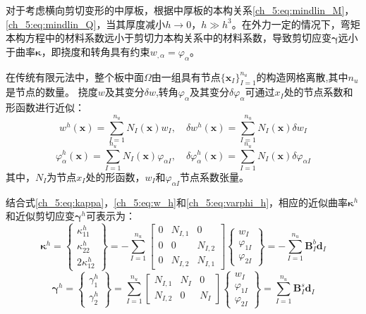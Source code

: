 对于考虑横向剪切变形的中厚板，根据中厚板的本构关系\eqref{ch_5:eq:mindlin_M}，\eqref{ch_5:eq:mindlin_Q}，当其厚度减小$h\rightarrow 0$，$h \gg h^3$。在外力一定的情况下，弯矩本构方程中的材料系数远小于剪切力本构关系中的材料系数，导致剪切应变$\boldsymbol \gamma$远小于曲率$\boldsymbol \kappa$，即挠度和转角具有约束$w_{,\alpha} = \varphi_\alpha$。

在传统有限元法中，整个板中面$\Omega$由一组具有节点$\{\boldsymbol x_I\}_{I=1}^{n_u}$的构造网格离散,其中$n_u$是节点的数量。
挠度$w$及其变分$\delta w $,转角$\varphi_\alpha$及其变分$\delta \varphi_\alpha $可通过$x_I$处的节点系数和形函数进行近似：
\begin{equation}\label{ch_5:eq:w_h}
    w^h(\boldsymbol x) = \sum_{I=1}^{n_u} N_I(\boldsymbol x) w_I, \quad \delta w^h(\boldsymbol x) = \sum_{I=1}^{n_u} N_I(\boldsymbol x) \delta w_I
\end{equation}
\begin{equation}\label{ch_5:eq:varphi_h}
    \varphi^h_{\alpha}(\boldsymbol x) = \sum_{I=1}^{n_u} N_I(\boldsymbol x) \varphi_{\alpha I}, \quad \delta \varphi^h_{\alpha}(\boldsymbol x) = \sum_{I=1}^{n_u} N_I(\boldsymbol x) \delta \varphi_{\alpha I}
\end{equation}
其中，$N_I$为节点$x_I$处的形函数，$w_I$和$\varphi_{\alpha I}$节点系数张量。

结合式\eqref{ch_5:eq:kappa}，\eqref{ch_5:eq:w_h}和\eqref{ch_5:eq:varphi_h}，相应的近似曲率$\boldsymbol\kappa^h$和近似剪切应变$\boldsymbol\gamma^h$可表示为：
\begin{equation}
    \boldsymbol\kappa^h = 
    \begin{Bmatrix}
        \kappa^h_{11} \\ \kappa^h_{22} \\ 2\kappa^h_{12} 
    \end{Bmatrix} = -\sum_{I=1}^{n_u}
    \begin{bmatrix}
        0 & N_{I,1} & 0 \\ 0 & 0 & N_{I,2} \\ 0 & N_{I,2} & N_{I,1}
    \end{bmatrix}
    \begin{Bmatrix}
        w_I \\ \varphi_{1I} \\ \varphi_{2I}
    \end{Bmatrix} = - \sum_{I=1}^{n_u} \boldsymbol B^b_I \boldsymbol d_I
\end{equation}
\begin{equation}
    \boldsymbol\gamma^h = 
    \begin{Bmatrix}
        \gamma^h_1 \\ \gamma^h_2
    \end{Bmatrix} = \sum_{I=1}^{n_u}
    \begin{bmatrix}
        N_{I,1} & N_I & 0 \\
        N_{I,2} & 0 & N_I
    \end{bmatrix}
    \begin{Bmatrix}
        w_I \\ \varphi_{1I} \\ \varphi_{2I}
    \end{Bmatrix} = \sum_{I=1}^{n_u} \boldsymbol B^s_I \boldsymbol d_I
\end{equation}

